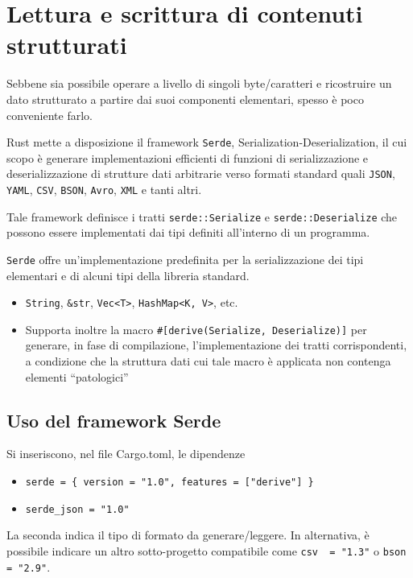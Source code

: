 \section{Lettura e scrittura di contenuti strutturati}
Sebbene sia possibile operare a livello di singoli byte/caratteri e ricostruire
un dato strutturato a partire dai suoi componenti elementari, spesso è poco
conveniente farlo.

Rust mette a disposizione il framework \texttt{Serde}, Serialization-Deserialization, il cui scopo è generare
implementazioni efficienti di funzioni di serializzazione e deserializzazione di
strutture dati arbitrarie verso formati standard quali \verb|JSON|, \verb|YAML|, \verb|CSV|,
\verb|BSON|, \verb|Avro|, \verb|XML|  e tanti altri.


Tale framework definisce i tratti \texttt{serde::Serialize} e \texttt{serde::Deserialize}
che possono essere implementati dai tipi definiti all'interno di un programma.

\texttt{Serde} offre un'implementazione predefinita per la serializzazione dei tipi
elementari e di alcuni tipi della libreria standard.

\begin{itemize}
  \item[] \texttt{String}, \texttt{\&str}, \texttt{Vec<T>}, \texttt{HashMap<K, V>}, etc.
  \item[] Supporta inoltre la macro \texttt{\#[derive(Serialize, Deserialize)]}
        per generare, in fase di compilazione, l'implementazione dei tratti
        corrispondenti, a condizione che la struttura dati cui tale macro è applicata
        non contenga elementi ``patologici''
\end{itemize}


\subsection{Uso del framework Serde}
Si inseriscono, nel file Cargo.toml, le dipendenze

\begin{itemize}
  \item[] \verb|serde = { version = "1.0", features = ["derive"] }|
  \item[] \verb|serde_json = "1.0"|
\end{itemize}


La seconda indica il tipo di formato da generare/leggere.
In alternativa, è possibile indicare un altro sotto-progetto compatibile come
\verb|csv  = "1.3"| o \verb|bson = "2.9"|.

